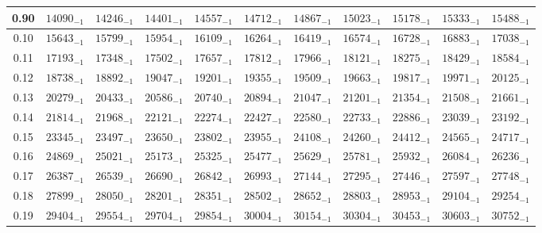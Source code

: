 \documentclass[10pt, a4paper]{article}
\begin{document}
\begin{center}
\begin{longtable}{c || c c c c c | c c c c c}
        0.90 & \({14090}_{-1}\) & \({14246}_{-1}\) & \({14401}_{-1}\) & \({14557}_{-1}\) & \({14712}_{-1}\) & \({14867}_{-1}\) & \({15023}_{-1}\) & \({15178}_{-1}\) & \({15333}_{-1}\) & \({15488}_{-1}\)\\
        \hline
        0.10 & \({15643}_{-1}\) & \({15799}_{-1}\) & \({15954}_{-1}\) & \({16109}_{-1}\) & \({16264}_{-1}\) & \({16419}_{-1}\) & \({16574}_{-1}\) & \({16728}_{-1}\) & \({16883}_{-1}\) & \({17038}_{-1}\)\\
        0.11 & \({17193}_{-1}\) & \({17348}_{-1}\) & \({17502}_{-1}\) & \({17657}_{-1}\) & \({17812}_{-1}\) & \({17966}_{-1}\) & \({18121}_{-1}\) & \({18275}_{-1}\) & \({18429}_{-1}\) & \({18584}_{-1}\)\\
        0.12 & \({18738}_{-1}\) & \({18892}_{-1}\) & \({19047}_{-1}\) & \({19201}_{-1}\) & \({19355}_{-1}\) & \({19509}_{-1}\) & \({19663}_{-1}\) & \({19817}_{-1}\) & \({19971}_{-1}\) & \({20125}_{-1}\)\\
        0.13 & \({20279}_{-1}\) & \({20433}_{-1}\) & \({20586}_{-1}\) & \({20740}_{-1}\) & \({20894}_{-1}\) & \({21047}_{-1}\) & \({21201}_{-1}\) & \({21354}_{-1}\) & \({21508}_{-1}\) & \({21661}_{-1}\)\\
        0.14 & \({21814}_{-1}\) & \({21968}_{-1}\) & \({22121}_{-1}\) & \({22274}_{-1}\) & \({22427}_{-1}\) & \({22580}_{-1}\) & \({22733}_{-1}\) & \({22886}_{-1}\) & \({23039}_{-1}\) & \({23192}_{-1}\)\\
        0.15 & \({23345}_{-1}\) & \({23497}_{-1}\) & \({23650}_{-1}\) & \({23802}_{-1}\) & \({23955}_{-1}\) & \({24108}_{-1}\) & \({24260}_{-1}\) & \({24412}_{-1}\) & \({24565}_{-1}\) & \({24717}_{-1}\)\\
        0.16 & \({24869}_{-1}\) & \({25021}_{-1}\) & \({25173}_{-1}\) & \({25325}_{-1}\) & \({25477}_{-1}\) & \({25629}_{-1}\) & \({25781}_{-1}\) & \({25932}_{-1}\) & \({26084}_{-1}\) & \({26236}_{-1}\)\\
        0.17 & \({26387}_{-1}\) & \({26539}_{-1}\) & \({26690}_{-1}\) & \({26842}_{-1}\) & \({26993}_{-1}\) & \({27144}_{-1}\) & \({27295}_{-1}\) & \({27446}_{-1}\) & \({27597}_{-1}\) & \({27748}_{-1}\)\\
        0.18 & \({27899}_{-1}\) & \({28050}_{-1}\) & \({28201}_{-1}\) & \({28351}_{-1}\) & \({28502}_{-1}\) & \({28652}_{-1}\) & \({28803}_{-1}\) & \({28953}_{-1}\) & \({29104}_{-1}\) & \({29254}_{-1}\)\\
        0.19 & \({29404}_{-1}\) & \({29554}_{-1}\) & \({29704}_{-1}\) & \({29854}_{-1}\) & \({30004}_{-1}\) & \({30154}_{-1}\) & \({30304}_{-1}\) & \({30453}_{-1}\) & \({30603}_{-1}\) & \({30752}_{-1}\)\\

\end{longtable}
\end{center}
\end{document}
